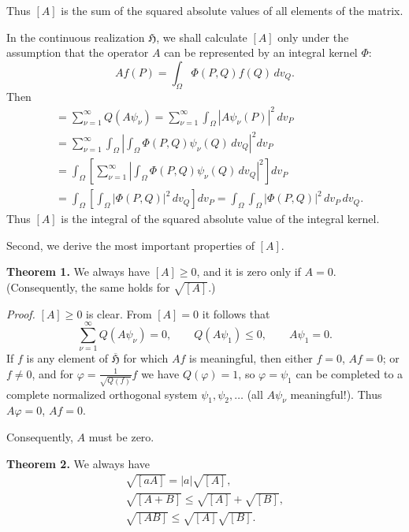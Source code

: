 \documentclass[fontsize=13pt,paper=b5,twoside,bookmarkpackage=false]{scrartcl}
\begin{document}
Thus $[A]$ is the sum of the squared absolute values of all elements of the matrix.

In the continuous realization $\mathfrak{H}$, we shall calculate $[A]$ only under the assumption that the operator $A$ can be represented by an integral kernel $\Phi$:
\[
 Af(P)=\int_\Omega\Phi(P,Q)f(Q)\,dv_Q.
\]
Then
\label{eq:XI:kernel-norm}
\begin{align*}
 [A]&=\sum_{\nu=1}^{\infty}Q(A\psi_\nu)
 =\sum_{\nu=1}^{\infty}\int_\Omega|A\psi_\nu(P)|^2\,dv_P\\
 &=\sum_{\nu=1}^{\infty}\int_\Omega
 \left|\int_\Omega\Phi(P,Q)\psi_\nu(Q)\,dv_Q\right|^2dv_P\\
 &=\int_\Omega\left[\sum_{\nu=1}^{\infty}
 \left|\int_\Omega\Phi(P,Q)\psi_\nu(Q)\,dv_Q\right|^2\right]dv_P\\
 &=\int_\Omega\left[\int_\Omega|\Phi(P,Q)|^2\,dv_Q\right]dv_P
 =\int_\Omega\int_\Omega|\Phi(P,Q)|^2\,dv_P\,dv_Q.
\end{align*}
Thus $[A]$ is the integral of the squared absolute value of the integral kernel.

Second, we derive the most important properties of $[A]$.

\par\medskip\noindent{}\label{thm:XI:1}\textbf{Theorem 1.}
We always have $[A]\geq0$, and it is zero only if $A=0$. (Consequently, the same holds for $\sqrt{[A]}$.)

\textit{Proof.} $[A]\geq0$ is clear. From $[A]=0$ it follows that
\[
 \sum_{\nu=1}^{\infty}Q(A\psi_\nu)=0,\qquad
 Q(A\psi_1)\leq0,\qquad A\psi_1=0.
\]
If $f$ is any element of $\overline{\mathfrak{H}}$ for which $Af$ is meaningful, then either $f=0$, $Af=0$; or $f\neq0$, and for $\varphi=\frac1{\sqrt{Q(f)}}f$ we have $Q(\varphi)=1$, so $\varphi=\psi_1$ can be completed to a complete normalized orthogonal system $\psi_1,\psi_2,\ldots$ (all $A\psi_\nu$ meaningful!). Thus $A\varphi=0$, $Af=0$.

Consequently, $A$ must be zero.

\par\medskip\noindent{}\label{thm:XI:2}\textbf{Theorem 2.}
We always have
\begin{gather*}
 \sqrt{[aA]}=|a|\sqrt{[A]},\\
 \sqrt{[A+B]}\leq\sqrt{[A]}+\sqrt{[B]},\\
 \sqrt{[AB]}\leq\sqrt{[A]}\sqrt{[B]}.
\end{gather*}
\end{document}
